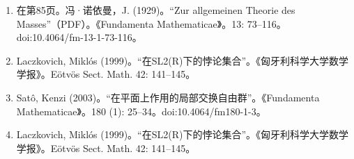 \begin{enumerate}
\item 在第85页。冯·诺依曼，J. (1929)。“Zur allgemeinen Theorie des Masses”（PDF）。《Fundamenta Mathematicae》。13: 73–116。doi:10.4064/fm-13-1-73-116。
\item Laczkovich, Miklós (1999)。“在SL2(R)下的悖论集合”。《匈牙利科学大学数学学报》。Eötvös Sect. Math. 42: 141–145。
\item Satô, Kenzi (2003)。“在平面上作用的局部交换自由群”。《Fundamenta Mathematicae》。180 (1): 25–34。doi:10.4064/fm180-1-3。
\item Laczkovich, Miklós (1999)。“在SL2(R)下的悖论集合”。《匈牙利科学大学数学学报》。Eötvös Sect. Math. 42: 141–145。

\end{enumerate}



 


